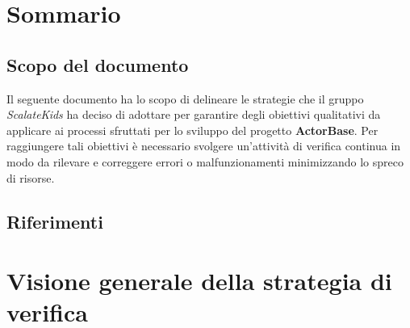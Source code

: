 \documentclass{scalatekids-article}
\begin{document}
\section{Sommario}
\subsection{Scopo del documento}
Il seguente documento ha lo scopo di delineare le strategie che il gruppo \textit{ScalateKids} ha deciso di adottare per garantire degli obiettivi qualitativi da applicare ai processi sfruttati per lo sviluppo del progetto \textbf{ActorBase}. Per raggiungere tali obiettivi è necessario svolgere un'attività di verifica continua in modo da rilevare e correggere errori o malfunzionamenti minimizzando lo spreco di risorse.
\prodPurpose
\glossExpl
\subsection{Riferimenti}
\newpage
\section{Visione generale della strategia di verifica}
\end{document}
